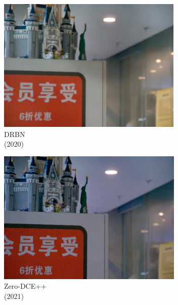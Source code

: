 \documentclass[a4paper]{ctexart}
\begin{document}
\begin{figure}[htbp]
\begin{subfigure}{0.17\columnwidth}
			\includegraphics[width=\linewidth]{picture/LLIE/VE-LOL-L/DRBN}
			\captionsetup{font=scriptsize}
			\caption*{DRBN \\ (2020)}
			\label{fig: DRBN_VE_LOL}	
		\end{subfigure}
		\begin{subfigure}{0.17\columnwidth}
			\includegraphics[width=\linewidth]{picture/LLIE/VE-LOL-L/Zero-DCE++}
			\captionsetup{font=scriptsize}
			\caption*{Zero-DCE++ \\ (2021)}
			\label{fig: Zero-DCE++}	
		\end{subfigure}
		\begin{subfigure}{0.17\columnwidth}

\end{subfigure}
\end{figure}
\end{document}
